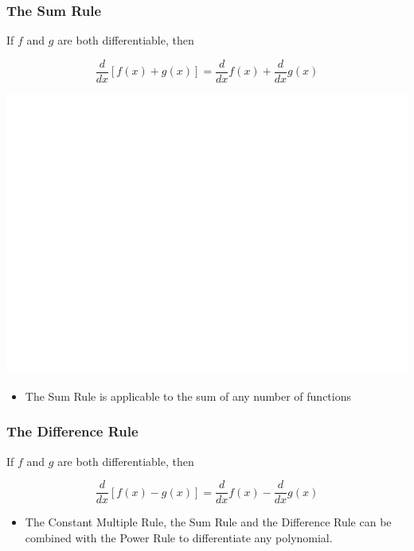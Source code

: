 \documentclass[]{book}
\providecommand{\tightlist}{%
  \setlength{\itemsep}{0pt}\setlength{\parskip}{0pt}}
\begin{document}
\hypertarget{the-sum-rule}{%
\subsubsection{The Sum Rule}\label{the-sum-rule}}

If \(f\) and \(g\) are both differentiable, then

\[\frac{d}{dx}[f(x)+g(x)]= \frac{d}{dx}f(x)+ \frac{d}{dx}g(x)\]

\begin{center}\includegraphics[width=1\linewidth]{figure/LB12-1} \end{center}

\begin{itemize}
\tightlist
\item
  The Sum Rule is applicable to the sum of any number of functions
\end{itemize}

\vspace{6pt}

\hypertarget{the-difference-rule}{%
\subsubsection{The Difference Rule}\label{the-difference-rule}}

If \(f\) and \(g\) are both differentiable, then

\[\frac{d}{dx}[f(x)-g(x)]= \frac{d}{dx}f(x)- \frac{d}{dx}g(x)\]

\begin{itemize}
\tightlist
\item
  The Constant Multiple Rule, the Sum Rule and the Difference Rule can be combined with the Power Rule to differentiate any polynomial.
\end{itemize}
\end{document}
